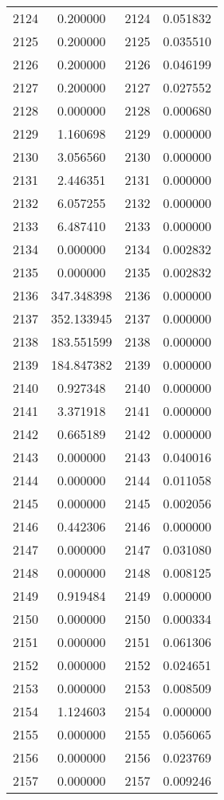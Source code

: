 \documentclass[12pt]{article}
\begin{document}
\begin{longtable}{@{}cccc@{}}
2124 & 0.200000 & 2124 & 0.051832 \\
2125 & 0.200000 & 2125 & 0.035510 \\
2126 & 0.200000 & 2126 & 0.046199 \\
2127 & 0.200000 & 2127 & 0.027552 \\
2128 & 0.000000 & 2128 & 0.000680 \\
2129 & 1.160698 & 2129 & 0.000000 \\
2130 & 3.056560 & 2130 & 0.000000 \\
2131 & 2.446351 & 2131 & 0.000000 \\
2132 & 6.057255 & 2132 & 0.000000 \\
2133 & 6.487410 & 2133 & 0.000000 \\
2134 & 0.000000 & 2134 & 0.002832 \\
2135 & 0.000000 & 2135 & 0.002832 \\
2136 & 347.348398 & 2136 & 0.000000 \\
2137 & 352.133945 & 2137 & 0.000000 \\
2138 & 183.551599 & 2138 & 0.000000 \\
2139 & 184.847382 & 2139 & 0.000000 \\
2140 & 0.927348 & 2140 & 0.000000 \\
2141 & 3.371918 & 2141 & 0.000000 \\
2142 & 0.665189 & 2142 & 0.000000 \\
2143 & 0.000000 & 2143 & 0.040016 \\
2144 & 0.000000 & 2144 & 0.011058 \\
2145 & 0.000000 & 2145 & 0.002056 \\
2146 & 0.442306 & 2146 & 0.000000 \\
2147 & 0.000000 & 2147 & 0.031080 \\
2148 & 0.000000 & 2148 & 0.008125 \\
2149 & 0.919484 & 2149 & 0.000000 \\
2150 & 0.000000 & 2150 & 0.000334 \\
2151 & 0.000000 & 2151 & 0.061306 \\
2152 & 0.000000 & 2152 & 0.024651 \\
2153 & 0.000000 & 2153 & 0.008509 \\
2154 & 1.124603 & 2154 & 0.000000 \\
2155 & 0.000000 & 2155 & 0.056065 \\
2156 & 0.000000 & 2156 & 0.023769 \\
2157 & 0.000000 & 2157 & 0.009246 \\

\end{longtable}
\end{document}
